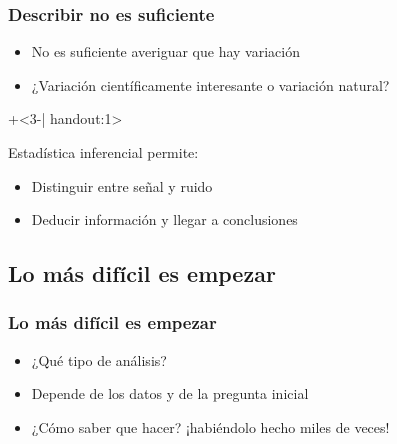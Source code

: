 \documentclass[gray,handout,mathserif]{beamer}
\begin{document}
\begin{frame}[label=infer]
\frametitle{Describir no es suficiente}
 \begin{itemize}[<1-| uncover@+-| handout:1>]
   \item No es suficiente averiguar que hay variaci\'on
   \item ¿Variaci\'on cient\'ificamente interesante o variaci\'on natural?
\end{itemize}
\bigskip
\onslide+<3-| handout:1>{%
\begin{beamerboxesrounded}[]{Estad\'istica \alert{inferencial} permite:}
  \begin{itemize}
     \item Distinguir entre señal y ruido
     \item Deducir informaci\'on y llegar a conclusiones
  \end{itemize}
\end{beamerboxesrounded}
}%
\end{frame}%


\subsection[¿C\'omo empezar?]{Lo m\'as dif\'icil es empezar}

\begin{frame}[label=getstart]
\frametitle{Lo m\'as dif\'icil es empezar}
  \begin{itemize}[<+-| handout:1>]
    \item  ¿Qu\'e tipo de an\'alisis?
    \item Depende de los datos y de la pregunta inicial
    \item  ¿C\'omo saber que hacer? ¡habi\'endolo hecho miles de veces!
  \end{itemize}
\end{frame}%
\end{document}
